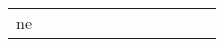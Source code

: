 \documentclass[runningheads]{llncs}
\begin{document}
\begin{table}[!ht]
\begin{tabular}{|p{7em}|p{2.5em}|p{2.5em}|p{3em}|p{2.5em}|p{3em}|p{2.5em}|p{3em}|p{2.5em}|p{3em}|p{2.5em}|p{3em}|}
ne
\end{tabular}
\end{table}
\end{document}
